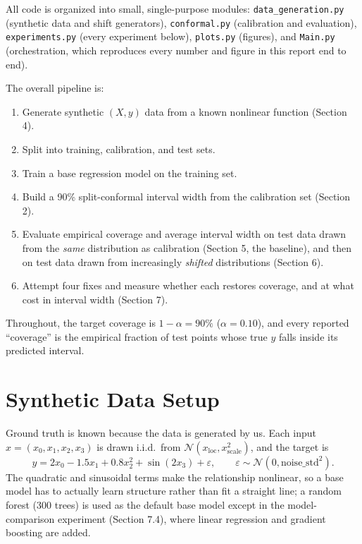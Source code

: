 \documentclass[11pt]{article}
\begin{document}
All code is organized into small, single-purpose modules:
\texttt{data\_generation.py} (synthetic data and shift generators),
\texttt{conformal.py} (calibration and evaluation), \texttt{experiments.py} (every
experiment below), \texttt{plots.py} (figures), and \texttt{Main.py} (orchestration,
which reproduces every number and figure in this report end to end).

The overall pipeline is:

\begin{enumerate}
  \item Generate synthetic $(X, y)$ data from a known nonlinear function (Section 4).
  \item Split into training, calibration, and test sets.
  \item Train a base regression model on the training set.
  \item Build a 90\% split-conformal interval width from the calibration set
    (Section 2).
  \item Evaluate empirical coverage and average interval width on test data drawn
    from the \emph{same} distribution as calibration (Section 5, the baseline), and
    then on test data drawn from increasingly \emph{shifted} distributions
    (Section 6).
  \item Attempt four fixes and measure whether each restores coverage, and at what
    cost in interval width (Section 7).
\end{enumerate}

Throughout, the target coverage is $1-\alpha = 90\%$ ($\alpha = 0.10$), and every
reported ``coverage'' is the empirical fraction of test points whose true $y$ falls
inside its predicted interval.

\section{Synthetic Data Setup}

Ground truth is known because the data is generated by us. Each input
$x = (x_0, x_1, x_2, x_3)$ is drawn i.i.d.\ from $\mathcal N(x_{\text{loc}},
x_{\text{scale}}^2)$, and the target is
\[
  y = 2x_0 - 1.5x_1 + 0.8x_2^2 + \sin(2x_3) + \varepsilon, \qquad
  \varepsilon \sim \mathcal N(0, \text{noise\_std}^2).
\]
The quadratic and sinusoidal terms make the relationship nonlinear, so a base model
has to actually learn structure rather than fit a straight line; a random forest
(300 trees) is used as the default base model except in the model-comparison
experiment (Section 7.4), where linear regression and gradient boosting are added.
\end{document}
